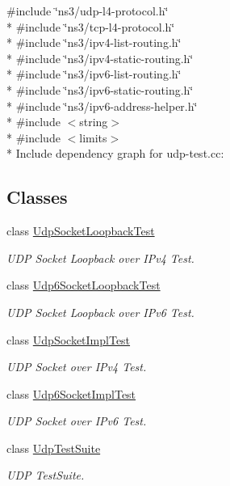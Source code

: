 {\ttfamily \#include \char`\"{}ns3/udp-\/l4-\/protocol.\+h\char`\"{}}\\*
{\ttfamily \#include \char`\"{}ns3/tcp-\/l4-\/protocol.\+h\char`\"{}}\\*
{\ttfamily \#include \char`\"{}ns3/ipv4-\/list-\/routing.\+h\char`\"{}}\\*
{\ttfamily \#include \char`\"{}ns3/ipv4-\/static-\/routing.\+h\char`\"{}}\\*
{\ttfamily \#include \char`\"{}ns3/ipv6-\/list-\/routing.\+h\char`\"{}}\\*
{\ttfamily \#include \char`\"{}ns3/ipv6-\/static-\/routing.\+h\char`\"{}}\\*
{\ttfamily \#include \char`\"{}ns3/ipv6-\/address-\/helper.\+h\char`\"{}}\\*
{\ttfamily \#include $<$string$>$}\\*
{\ttfamily \#include $<$limits$>$}\\*
Include dependency graph for udp-\/test.cc\+:
\subsection*{Classes}
\begin{DoxyCompactItemize}
\item 
class \hyperlink{classUdpSocketLoopbackTest}{Udp\+Socket\+Loopback\+Test}
\begin{DoxyCompactList}\small\item\em U\+DP Socket Loopback over I\+Pv4 Test. \end{DoxyCompactList}\item 
class \hyperlink{classUdp6SocketLoopbackTest}{Udp6\+Socket\+Loopback\+Test}
\begin{DoxyCompactList}\small\item\em U\+DP Socket Loopback over I\+Pv6 Test. \end{DoxyCompactList}\item 
class \hyperlink{classUdpSocketImplTest}{Udp\+Socket\+Impl\+Test}
\begin{DoxyCompactList}\small\item\em U\+DP Socket over I\+Pv4 Test. \end{DoxyCompactList}\item 
class \hyperlink{classUdp6SocketImplTest}{Udp6\+Socket\+Impl\+Test}
\begin{DoxyCompactList}\small\item\em U\+DP Socket over I\+Pv6 Test. \end{DoxyCompactList}\item 
class \hyperlink{classUdpTestSuite}{Udp\+Test\+Suite}
\begin{DoxyCompactList}\small\item\em U\+DP Test\+Suite. \end{DoxyCompactList}\end{DoxyCompactItemize}

